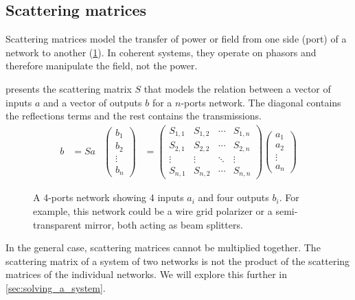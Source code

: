 \subsection{Scattering matrices}
Scattering matrices \cite{siegman1986lasers} model the transfer of power or field from one side (port) of a network to another (\cref{fig:scattering_matrix_notations}).
In coherent systems, they operate on phasors and therefore manipulate the field, not the power.

 presents the scattering matrix $S$ that models the relation between a vector of inputs $a$ and a vector of outputs $b$ for a $n$-ports network.
The diagonal contains the reflections terms and the rest contains the transmissions.
\begin{align}
    b &= S a
    &
    \begin{pmatrix}
        b_1\\
        b_2\\
        \vdots\\
        b_n
    \end{pmatrix}
    &=
    \begin{pmatrix}
        S_{1, 1} & S_{1, 2} & \cdots & S_{1, n} \\
        S_{2, 1} & S_{2, 2} & \cdots & S_{2, n} \\
        \vdots   & \vdots   & \ddots & \vdots   \\
        S_{n, 1} & S_{n, 2} & \cdots & S_{n, n}
    \end{pmatrix}
    \begin{pmatrix}
        a_1\\
        a_2\\
        \vdots\\
        a_n
    \end{pmatrix}
    \label{eq:scattering_matrix}
\end{align}

\begin{figure}[hbtp]
    \centering
    
    \caption{A 4-ports network showing 4 inputs $a_i$ and four outputs $b_i$.  For example, this network could be a wire grid polarizer or a semi-transparent mirror, both acting as beam splitters.}%
    \label{fig:scattering_matrix_notations}
\end{figure}

In the general case, scattering matrices cannot be multiplied together.
The scattering matrix of a system of two networks is not the product of the scattering matrices of the individual networks.
We will explore this further in \cref{sec:solving_a_system}.

